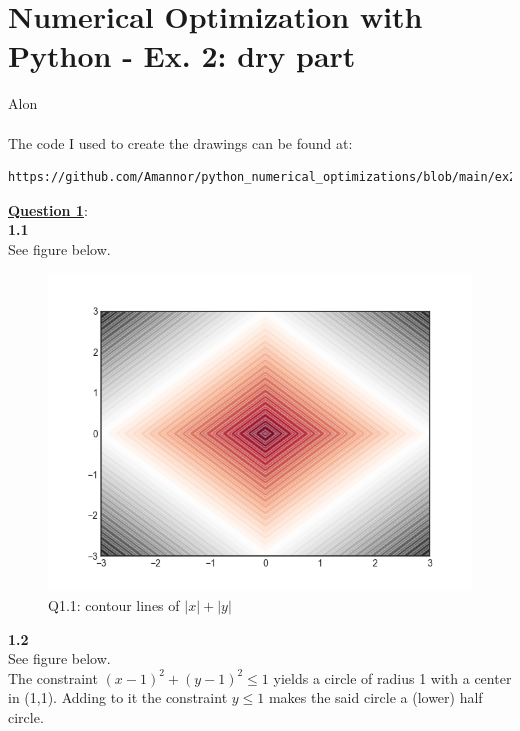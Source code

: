 \documentclass[fleqn]{article}
\begin{document}
\newcommand\tab[1][1cm]{\hspace*{#1}}
\section*{Numerical Optimization with Python -  Ex. 2: dry part}
Alon\\ \\

The code I used to create the drawings can be found at:\\

\begin{lstlisting}[breaklines]
https://github.com/Amannor/python_numerical_optimizations/blob/main/ex2/dry_part/contour_plotter.py
\end{lstlisting}

\underline{\textbf{Question 1}}:\\

\textbf{1.1} \\
See figure below. \\

\begin{figure}[h!]
\includegraphics[width=0.8\linewidth]{q1_1.PNG}
\caption{Q1.1: contour lines of $\lvert x\rvert +\lvert y \rvert $}
\end{figure}

\textbf{1.2} \\
See figure below. \\
The constraint $(x-1)^2+(y-1)^2 \leq 1$ yields a circle of radius 1 with a center in (1,1). Adding to it the constraint $y \leq 1$ makes the said circle a (lower) half circle.\\
\end{document}
